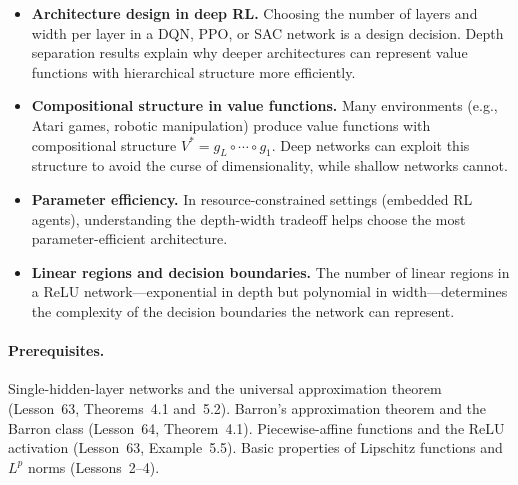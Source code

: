 \documentclass[11pt,a4paper]{article}
\begin{document}
\begin{rlconnection}[title={Why Depth-Width Tradeoffs Matter for RL/ML}]
\begin{itemize}[nosep]
  \item \textbf{Architecture design in deep RL.}  Choosing the number of
    layers and width per layer in a DQN, PPO, or SAC network is a design
    decision.  Depth separation results explain why deeper architectures
    can represent value functions with hierarchical structure more
    efficiently.
  \item \textbf{Compositional structure in value functions.}  Many
    environments (e.g., Atari games, robotic manipulation) produce value
    functions with compositional structure $V^* = g_L \circ \cdots
    \circ g_1$.  Deep networks can exploit this structure to avoid the
    curse of dimensionality, while shallow networks cannot.
  \item \textbf{Parameter efficiency.}  In resource-constrained settings
    (embedded RL agents), understanding the depth-width tradeoff helps
    choose the most parameter-efficient architecture.
  \item \textbf{Linear regions and decision boundaries.}  The number of
    linear regions in a ReLU network---exponential in depth but
    polynomial in width---determines the complexity of the decision
    boundaries the network can represent.
\end{itemize}
\end{rlconnection}

\paragraph{Prerequisites.}
Single-hidden-layer networks and the universal approximation theorem
(Lesson~63, Theorems~4.1 and~5.2).  Barron's approximation theorem
and the Barron class (Lesson~64, Theorem~4.1).  Piecewise-affine
functions and the ReLU activation (Lesson~63, Example~5.5).  Basic
properties of Lipschitz functions and $L^p$ norms (Lessons~2--4).
\end{document}
